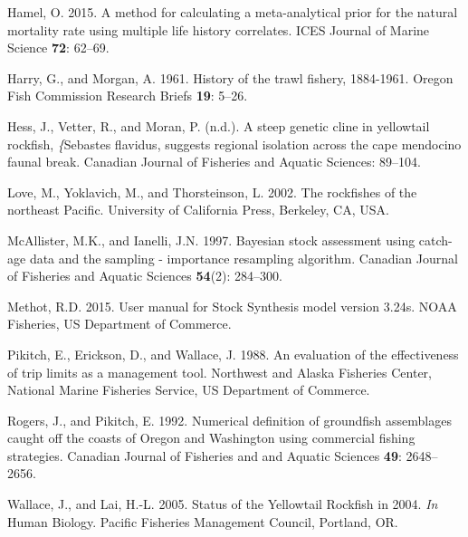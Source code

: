 \documentclass[12pt,]{article}
\begin{document}
\hypertarget{ref-Hamel2015}{}
Hamel, O. 2015. A method for calculating a meta-analytical prior for the
natural mortality rate using multiple life history correlates. ICES
Journal of Marine Science \textbf{72}: 62--69.

\hypertarget{ref-Harry1961}{}
Harry, G., and Morgan, A. 1961. History of the trawl fishery, 1884-1961.
Oregon Fish Commission Research Briefs \textbf{19}: 5--26.

\hypertarget{ref-Hess2011}{}
Hess, J., Vetter, R., and Moran, P. (n.d.). A steep genetic cline in
yellowtail rockfish, \emph{\{}Sebastes flavidus, suggests regional
isolation across the cape mendocino faunal break. Canadian Journal of
Fisheries and Aquatic Sciences: 89--104.

\hypertarget{ref-Love2002}{}
Love, M., Yoklavich, M., and Thorsteinson, L. 2002. The rockfishes of
the northeast Pacific. University of California Press, Berkeley, CA,
USA.

\hypertarget{ref-McAllister1997}{}
McAllister, M.K., and Ianelli, J.N. 1997. Bayesian stock assessment
using catch-age data and the sampling - importance resampling algorithm.
Canadian Journal of Fisheries and Aquatic Sciences \textbf{54}(2):
284--300.

\hypertarget{ref-Methot2015}{}
Methot, R.D. 2015. User manual for Stock Synthesis model version 3.24s.
NOAA Fisheries, US Department of Commerce.

\hypertarget{ref-Pikitch1988}{}
Pikitch, E., Erickson, D., and Wallace, J. 1988. An evaluation of the
effectiveness of trip limits as a management tool. Northwest and Alaska
Fisheries Center, National Marine Fisheries Service, US Department of
Commerce.

\hypertarget{ref-Rogers1992}{}
Rogers, J., and Pikitch, E. 1992. Numerical definition of groundfish
assemblages caught off the coasts of Oregon and Washington using
commercial fishing strategies. Canadian Journal of Fisheries and and
Aquatic Sciences \textbf{49}: 2648--2656.

\hypertarget{ref-Wallace2005}{}
Wallace, J., and Lai, H.-L. 2005. Status of the Yellowtail Rockfish in
2004. \emph{In} Human Biology. Pacific Fisheries Management Council,
Portland, OR.
\end{document}
